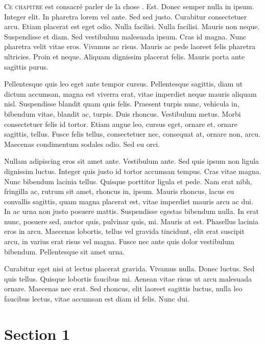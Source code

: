 \label{chap:chap1}
\introformatting

\lettrine{C}{e chapitre} est consacré parler de la chose \suiv.
Est. Donec semper nulla in ipsum. Integer elit. In pharetra lorem vel ante.
Sed sed justo. Curabitur consectetuer arcu. Etiam placerat est eget odio. Nulla
facilisi. Nulla facilisi. Mauris non neque. Suspendisse et diam. Sed vestibulum
malesuada ipsum. Cras id magna. Nunc pharetra velit vitae eros. Vivamus ac
risus. Mauris ac pede laoreet felis pharetra ultricies. Proin et neque. Aliquam
dignissim placerat felis. Mauris porta ante sagittis purus.

Pellentesque quis leo eget ante tempor cursus. Pellentesque sagittis, diam ut
dictum accumsan, magna est viverra erat, vitae imperdiet neque mauris aliquam
nisl. Suspendisse blandit quam quis felis. Praesent turpis nunc, vehicula in,
bibendum vitae, blandit ac, turpis. Duis rhoncus. Vestibulum metus. Morbi
consectetuer felis id tortor. Etiam augue leo, cursus eget, ornare et, ornare
sagittis, tellus. Fusce felis tellus, consectetuer nec, consequat at, ornare
non, arcu. Maecenas condimentum sodales odio. Sed eu orci.

Nullam adipiscing eros sit amet ante. Vestibulum ante. Sed quis ipsum non ligula
dignissim luctus. Integer quis justo id tortor accumsan tempus. Cras vitae
magna. Nunc bibendum lacinia tellus. Quisque porttitor ligula et pede. Nam erat
nibh, fringilla ac, rutrum sit amet, rhoncus in, ipsum. Mauris rhoncus, lacus eu
convallis sagittis, quam magna placerat est, vitae imperdiet mauris arcu ac dui.
In ac urna non justo posuere mattis. Suspendisse egestas bibendum nulla. In erat
nunc, posuere sed, auctor quis, pulvinar quis, mi. Mauris at est. Phasellus
lacinia eros in arcu. Maecenas lobortis, tellus vel gravida tincidunt, elit erat
suscipit arcu, in varius erat risus vel magna. Fusce nec ante quis dolor
vestibulum bibendum. Pellentesque sit amet urna.

Curabitur eget nisi at lectus placerat gravida. Vivamus nulla. Donec luctus. Sed
quis tellus. Quisque lobortis faucibus mi. Aenean vitae risus ut arcu malesuada
ornare. Maecenas nec erat. Sed rhoncus, elit laoreet sagittis luctus, nulla leo
faucibus lectus, vitae accumsan est diam id felis. Nunc dui.


\section{Section 1}
\label{sec-section1}

